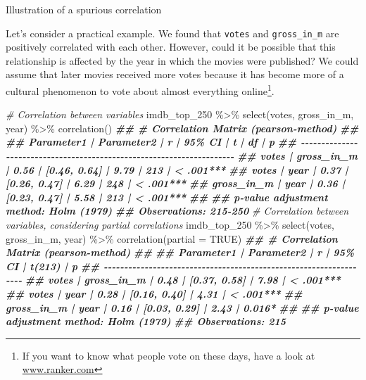 \documentclass[
]{book}
\newenvironment{Shaded}{\begin{snugshade}}{\end{snugshade}}
\newcommand{\AttributeTok}[1]{\textcolor[rgb]{0.77,0.63,0.00}{#1}}
\newcommand{\CommentTok}[1]{\textcolor[rgb]{0.56,0.35,0.01}{\textit{#1}}}
\newcommand{\ConstantTok}[1]{\textcolor[rgb]{0.00,0.00,0.00}{#1}}
\newcommand{\DocumentationTok}[1]{\textcolor[rgb]{0.56,0.35,0.01}{\textbf{\textit{#1}}}}
\newcommand{\FunctionTok}[1]{\textcolor[rgb]{0.00,0.00,0.00}{#1}}
\newcommand{\NormalTok}[1]{#1}
\newcommand{\SpecialCharTok}[1]{\textcolor[rgb]{0.00,0.00,0.00}{#1}}
\begin{document}
\label{fig:illustration-spurious-correlation}Illustration of a spurious correlation

Let's consider a practical example. We found that \texttt{votes} and \texttt{gross\_in\_m} are positively correlated with each other. However, could it be possible that this relationship is affected by the year in which the movies were published? We could assume that later movies received more votes because it has become more of a cultural phenomenon to vote about almost everything online\footnote{If you want to know what people vote on these days, have a look at \href{https://www.ranker.com}{www.ranker.com}}.

\begin{Shaded}
\begin{Highlighting}[]
\CommentTok{\# Correlation between variables}
\NormalTok{imdb\_top\_250 }\SpecialCharTok{\%\textgreater{}\%} 
  \FunctionTok{select}\NormalTok{(votes, gross\_in\_m, year) }\SpecialCharTok{\%\textgreater{}\%} 
  \FunctionTok{correlation}\NormalTok{()}
\DocumentationTok{\#\# \# Correlation Matrix (pearson{-}method)}
\DocumentationTok{\#\# }
\DocumentationTok{\#\# Parameter1 | Parameter2 |    r |       95\% CI |    t |  df |         p}
\DocumentationTok{\#\# {-}{-}{-}{-}{-}{-}{-}{-}{-}{-}{-}{-}{-}{-}{-}{-}{-}{-}{-}{-}{-}{-}{-}{-}{-}{-}{-}{-}{-}{-}{-}{-}{-}{-}{-}{-}{-}{-}{-}{-}{-}{-}{-}{-}{-}{-}{-}{-}{-}{-}{-}{-}{-}{-}{-}{-}{-}{-}{-}{-}{-}{-}{-}{-}{-}{-}{-}{-}{-}{-}}
\DocumentationTok{\#\# votes      | gross\_in\_m | 0.56 | [0.46, 0.64] | 9.79 | 213 | \textless{} .001***}
\DocumentationTok{\#\# votes      |       year | 0.37 | [0.26, 0.47] | 6.29 | 248 | \textless{} .001***}
\DocumentationTok{\#\# gross\_in\_m |       year | 0.36 | [0.23, 0.47] | 5.58 | 213 | \textless{} .001***}
\DocumentationTok{\#\# }
\DocumentationTok{\#\# p{-}value adjustment method: Holm (1979)}
\DocumentationTok{\#\# Observations: 215{-}250}
\CommentTok{\# Correlation between variables, considering partial correlations}
\NormalTok{imdb\_top\_250 }\SpecialCharTok{\%\textgreater{}\%} 
  \FunctionTok{select}\NormalTok{(votes, gross\_in\_m, year) }\SpecialCharTok{\%\textgreater{}\%} 
  \FunctionTok{correlation}\NormalTok{(}\AttributeTok{partial =} \ConstantTok{TRUE}\NormalTok{)}
\DocumentationTok{\#\# \# Correlation Matrix (pearson{-}method)}
\DocumentationTok{\#\# }
\DocumentationTok{\#\# Parameter1 | Parameter2 |    r |       95\% CI | t(213) |         p}
\DocumentationTok{\#\# {-}{-}{-}{-}{-}{-}{-}{-}{-}{-}{-}{-}{-}{-}{-}{-}{-}{-}{-}{-}{-}{-}{-}{-}{-}{-}{-}{-}{-}{-}{-}{-}{-}{-}{-}{-}{-}{-}{-}{-}{-}{-}{-}{-}{-}{-}{-}{-}{-}{-}{-}{-}{-}{-}{-}{-}{-}{-}{-}{-}{-}{-}{-}{-}{-}{-}}
\DocumentationTok{\#\# votes      | gross\_in\_m | 0.48 | [0.37, 0.58] |   7.98 | \textless{} .001***}
\DocumentationTok{\#\# votes      |       year | 0.28 | [0.16, 0.40] |   4.31 | \textless{} .001***}
\DocumentationTok{\#\# gross\_in\_m |       year | 0.16 | [0.03, 0.29] |   2.43 | 0.016*   }
\DocumentationTok{\#\# }
\DocumentationTok{\#\# p{-}value adjustment method: Holm (1979)}
\DocumentationTok{\#\# Observations: 215}
\end{Highlighting}
\end{Shaded}
\end{document}
